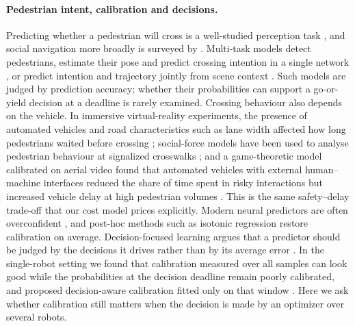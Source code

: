 \documentclass[a4paper,fleqn]{cas-dc}
\begin{document}
\paragraph{Pedestrian intent, calibration and decisions.}
Predicting whether a pedestrian will cross is a well-studied perception task \citep{rasouli2019pie}, and social navigation more broadly is surveyed by \citet{mavrogiannis2023core}. Multi-task models detect pedestrians, estimate their pose and predict crossing intention in a single network \cite{razali2021pedestrian}, or predict intention and trajectory jointly from scene context \cite{munir2025context}. Such models are judged by prediction accuracy; whether their probabilities can support a go-or-yield decision at a deadline is rarely examined. Crossing behaviour also depends on the vehicle. In immersive virtual-reality experiments, the presence of automated vehicles and road characteristics such as lane width affected how long pedestrians waited before crossing \cite{KalatianFarooq2021}; social-force models have been used to analyse pedestrian behaviour at signalized crosswalks \cite{Zeng2014}; and a game-theoretic model calibrated on aerial video found that automated vehicles with external human--machine interfaces reduced the share of time
spent in risky interactions but increased vehicle delay at high pedestrian volumes \cite{wang2026automated}. This is the same safety--delay trade-off that our cost model prices explicitly. Modern neural predictors are often overconfident \citep{guo2017calibration}, and post-hoc methods such as isotonic regression \citep{zadrozny2002isotonic} restore calibration on average. Decision-focused learning argues that a predictor should be judged by the decisions it drives rather than by its average error \citep{elmachtoub2022spo}. In the single-robot setting we found that calibration measured over all samples can look good while the probabilities at the decision deadline remain poorly calibrated, and proposed decision-aware calibration fitted only on that window \citep{udekwe2026askoract}. Here we ask whether calibration still matters when the decision is made by an optimizer over several robots.
\end{document}
